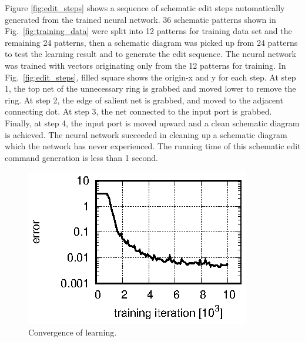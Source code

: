 \documentclass[twocolumn]{article}
\begin{document}
Figure \ref{fig:edit_steps} shows a sequence of schematic edit steps
automatically generated from the trained neural network.
36 schematic patterns shown in Fig.\ \ref{fig:training_data}
were split into 12 patterns for training data set
and the remaining 24 patterns,
then a schematic diagram was picked up
from 24 patterns to test the learning result
and to generate the edit sequence.
The neural network was trained with vectors
originating only from the 12 patterns for training.
In Fig.\ \ref{fig:edit_steps}, filled square shows the origin-x and y
for each step.
At step 1, the top net of the unnecessary ring is grabbed and moved lower
to remove the ring.
At step 2, the edge of salient net is grabbed,
and moved to the adjacent connecting dot.
At step 3, the net connected to the input port is grabbed.
Finally, at step 4, the input port is moved upward
and a clean schematic diagram is achieved.
The neural network succeeded in cleaning up a schematic diagram
which the network has never experienced.
The running time of this schematic edit command generation
is less than 1 second.

\begin{figure}[!tp]
 \begin{center}
  \begin{minipage}{\hsize}
   \includegraphics[width=\hsize]{fig/errors_03.eps}
   \caption{Convergence of learning.}
   \label{fig:errors}
  \end{minipage}
 \end{center}
\end{figure}
\end{document}
